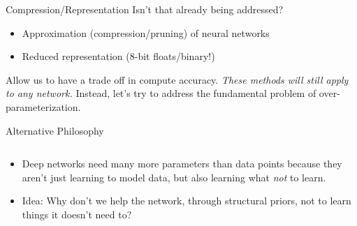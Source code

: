 \documentclass[t,xcolor=dvipsnames]{beamer}
\begin{document}
\begin{frame}{Compression/Representation}
Isn't that already being addressed?
\begin{itemize}
\item Approximation (compression/pruning) of neural networks
\item Reduced representation (8-bit floats/binary!)
\end{itemize}
Allow us to have a trade off in compute \vs accuracy.
\vfill
\textit{These methods will still apply to any network.} Instead, let's try to  address the fundamental problem of over-parameterization.
\end{frame}
\begin{frame}{Alternative Philosophy}
\begin{columns}[onlytextwidth,T]
\begin{column}{0.65\textwidth}
\begin{itemize}
    \item Deep networks need many more parameters than data points because they aren't just learning to model data, but also learning what \emph{\color{blue}not} to learn. 
    \item Idea: Why don't we help the network, through structural priors, not to learn things it doesn't need to?
\end{itemize}
\end{column}

\end{columns}
\end{frame}
\end{document}
